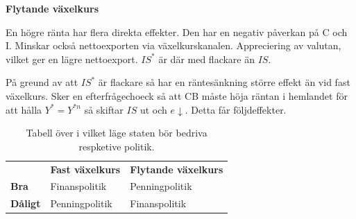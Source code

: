 \documentclass{article}
\begin{document}
\vspace{5mm} \par \noindent 
\textbf{Flytande växelkurs}
\vspace{5mm} \par \noindent 

En högre ränta har flera direkta effekter. Den har en negativ påverkan på C och I. Minskar också nettoexporten via växelkurskanalen. Appreciering av valutan, vilket ger en lägre nettoexport. $ IS^*$ är där med flackare än $ IS$. 

\vspace{5mm} \par \noindent 

På greund av att $ IS^* $ är flackare så har en räntesänkning större effekt än vid fast växelkurs. Sker en efterfrågechoeck så att CB måste höja räntan i hemlandet för att hålla $ Y^* = Y^{*n} $ så skiftar $ IS $ ut och $ e \downarrow $. Detta får följdeffekter. 


\begin{table}[]
\centering
\caption{Tabell över i vilket läge staten bör bedriva respketive politik.}
\label{my-label}
\begin{tabular}{lll}
       & \textbf{Fast växelkurs} & \textbf{Flytande växelkurs} \\
\textbf{Bra}    & Finanspolitik  & Penningpolitik     \\
\textbf{Dåligt} & Penningpolitik & Finanspolitik     
\end{tabular}
\end{table}





\end{document}
